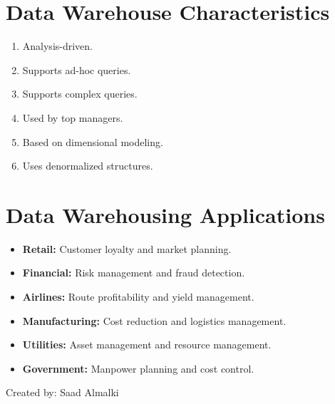 \documentclass[12pt]{article}
\begin{document}
\section{Data Warehouse Characteristics}

\begin{enumerate}
    \item Analysis-driven.
    \item Supports ad-hoc queries.
    \item Supports complex queries.
    \item Used by top managers.
    \item Based on dimensional modeling.
    \item Uses denormalized structures.
\end{enumerate}
\section{Data Warehousing Applications}
\begin{itemize}
    \item \textbf{Retail:} Customer loyalty and market planning.
    \item \textbf{Financial:} Risk management and fraud detection.
    \item \textbf{Airlines:} Route profitability and yield management.
    \item \textbf{Manufacturing:} Cost reduction and logistics management.
    \item \textbf{Utilities:} Asset management and resource management.
    \item \textbf{Government:} Manpower planning and cost control.
\end{itemize}

\begin{flushright}
Created by: Saad Almalki \\
\end{flushright}
\end{document}
